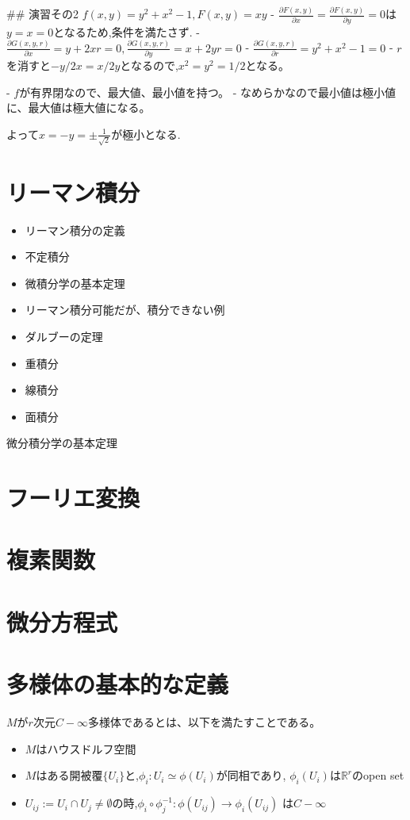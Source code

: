 \documentclass{ujarticle}
\begin{document}
## 演習その2
$f(x, y) = y^2 + x^2 - 1, F(x, y) = xy$
- $\frac{\partial F(x, y)}{\partial x} = \frac{\partial F(x, y)}{\partial y} = 0$は$y = x =0$となるため,条件を満たさず.
- $\frac{\partial G(x, y, r)}{\partial x} = y + 2xr = 0, \frac{\partial G(x, y, r)}{\partial y} = x + 2yr = 0$
- $\frac{\partial G(x, y, r)}{\partial r} = y^2 + x^2 - 1 = 0$
- $r$を消すと$- y /2x = x/ 2y$となるので,$x^2 = y^2 = 1/2$となる。

- $f$が有界閉なので、最大値、最小値を持つ。
- なめらかなので最小値は極小値に、最大値は極大値になる。

よって$x = - y = \pm \frac{1}{\sqrt{2}}$が極小となる.

\section{リーマン積分}
\begin{itemize}
\item リーマン積分の定義
\item 不定積分
\item 微積分学の基本定理
\item リーマン積分可能だが、積分できない例
\item ダルブーの定理
\item 重積分
\item 線積分
\item 面積分
\end{itemize}

微分積分学の基本定理

\section{フーリエ変換}


\section{複素関数}

\section{微分方程式}



\section{多様体の基本的な定義}
\begin{dfn}
$M$が$r$次元$C-{\infty}$多様体であるとは、以下を満たすことである。
 \begin{itemize}
   \item $M$はハウスドルフ空間
   \item $M$はある開被覆$\{U_i\}$と,$\phi_i:U_i \simeq \phi(U_i)$が同相であり,
         $\phi_i(U_i)$は$\mathbb{R}^r$のopen set
   \item $U_{ij} := U_i \cap U_j \neq \emptyset$の時,$\phi_i \circ \phi_j^{-1}: \phi(U_{ij}) \to \phi_i(U_{ij})$
         は$C-\infty$
 \end{itemize}
\end{dfn}
\end{document}
